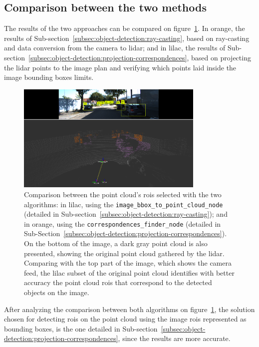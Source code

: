 \subsection{Comparison between the two methods}
The results of the two approaches can be compared on figure~\ref{fig:rois-matching-comparison}. In orange, the results of Sub-section~\ref{subsec:object-detection:ray-casting}, based on ray-casting and data conversion from the camera to \ac{lidar}; and in lilac, the results of Sub-section~\ref{subsec:object-detection:projection-correspondences}, based on projecting the \ac{lidar} points to the image plan and verifying which points laid inside the image bounding boxes limits.


\begin{figure}[!ht]
	\centering
	\includegraphics[width=0.8\textwidth]{img/image-object-to-point-cloud/rois-comparison.png}
	\caption{Comparison between the point cloud's \acp{roi} selected with the two algorithms: in lilac, using the \texttt{image\_bbox\_to\_point\_cloud\_node} (detailed in Sub-section~\ref{subsec:object-detection:ray-casting}); and in orange, using the \texttt{correspondences\_finder\_node} (detailed in Sub-Section~\ref{subsec:object-detection:projection-correspondences}). On the bottom of the image, a dark gray point cloud is also presented, showing the original point cloud gathered by the \ac{lidar}. Comparing with the top part of the image, which shows the camera feed, the lilac subset of the original point cloud identifies with better accuracy the point cloud \acp{roi} that correspond to the detected objects on the image.}
	\label{fig:rois-matching-comparison}
\end{figure}

After analyzing the comparison between both algorithms on figure~\ref{fig:rois-matching-comparison}, the solution chosen for detecting \acp{roi} on the point cloud using the image \acp{roi} represented as bounding boxes, is the one detailed in Sub-section~\ref{subsec:object-detection:projection-correspondences}, since the results are more accurate.

